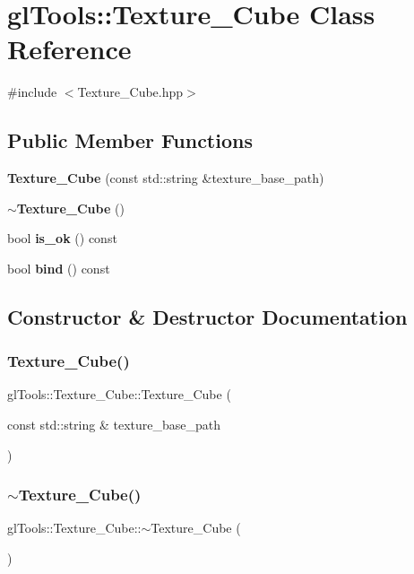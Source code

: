 \section{gl\+Tools\+::Texture\+\_\+\+Cube Class Reference}
\label{classgl_tools_1_1_texture___cube}


{\ttfamily \#include $<$Texture\+\_\+\+Cube.\+hpp$>$}

\subsection*{Public Member Functions}
\begin{DoxyCompactItemize}
\item 
\textbf{ Texture\+\_\+\+Cube} (const std\+::string \&texture\+\_\+base\+\_\+path)
\item 
\textbf{ $\sim$\+Texture\+\_\+\+Cube} ()
\item 
bool \textbf{ is\+\_\+ok} () const
\item 
bool \textbf{ bind} () const
\end{DoxyCompactItemize}


\subsection{Constructor \& Destructor Documentation}
\mbox{\label{classgl_tools_1_1_texture___cube_ae5ccb7fdaed6dc7d73875c64424f024f}} 
\subsubsection{Texture\_Cube()}
{\footnotesize\ttfamily gl\+Tools\+::\+Texture\+\_\+\+Cube\+::\+Texture\+\_\+\+Cube (\begin{DoxyParamCaption}\item[{const std\+::string \&}]{texture\+\_\+base\+\_\+path }\end{DoxyParamCaption})}

\mbox{\label{classgl_tools_1_1_texture___cube_a15717bb8fddb23705abc123a71993a5a}} 
\subsubsection{$\sim$Texture\_Cube()}
{\footnotesize\ttfamily gl\+Tools\+::\+Texture\+\_\+\+Cube\+::$\sim$\+Texture\+\_\+\+Cube (\begin{DoxyParamCaption}{ }\end{DoxyParamCaption})}



